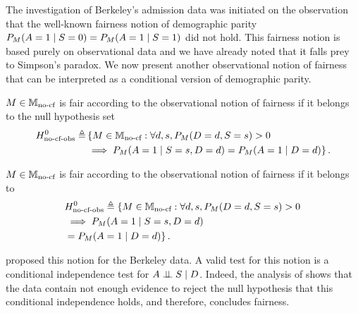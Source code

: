 The investigation of Berkeley's admission data was initiated on the observation that the well-known fairness notion of demographic parity $P_{M}{\left({A=1 \mid S = 0}\right)} = P_{M}{\left({A=1 \mid S = 1}\right)}$ did not hold. This fairness notion is based purely on observational data and we have already noted that it falls prey to Simpson's paradox. We now present another observational notion of fairness that can be interpreted as a conditional version of demographic parity.
\ifdefined\SINGLE
\begin{definition}
$M \in \mathbb{M}_{\text{no-cf}}$ is fair according to the observational notion of fairness if it belongs to the null hypothesis set 
\begin{align*}
H^0_{\text{no-cf-obs}} \triangleq &\left \lbrace M \in \mathbb{M}_{\text{no-cf}} :  \forall d, s, P_{M}{\left({D = d, S = s}\right)} >0 \right.\\
&\left. \implies P_{M}{\left({A=1 \mid S =s, D = d}\right)} = P_{M}{\left({A=1 \mid D = d}\right)} \right \rbrace.
\end{align*}
\end{definition}
\else
\begin{definition}
$M \in \mathbb{M}_{\text{no-cf}}$ is fair according to the observational notion of fairness if it belongs to 
\begin{align*}
&H^0_{\text{no-cf-obs}} \triangleq \left \lbrace M \in \mathbb{M}_{\text{no-cf}} :  \forall d, s,  P_{M}{\left({D = d, S = s}\right)} >0 \right.\\
&\left. \implies P_{M}{\left({A=1 \mid S =s, D = d}\right)} \right. \\
&\left.= P_{M}{\left({A=1 \mid D = d}\right)} \right \rbrace.
\end{align*}
\end{definition}
\fi

\citet{BickelHO75} proposed this notion for the Berkeley data. A valid test for this notion is a conditional independence test for $A \perp\!\!\!\perp S \mid D$. Indeed, the analysis of \citet{BickelHO75} shows that the data contain not enough evidence to reject the null hypothesis that this conditional independence holds, and therefore, concludes fairness. 

